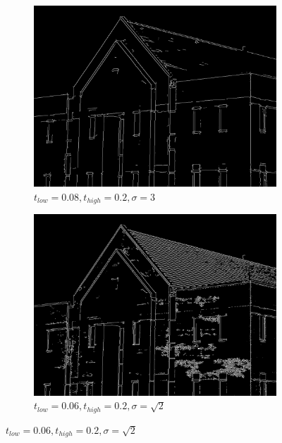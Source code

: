 \documentclass[a4paper]{article}
\begin{document}
\begin{figure}[h]
    
        \centering
        \begin{subfigure}[b]{0.3\textwidth}
                \centering
                \includegraphics[width=\textwidth]{q2-house-canny-020083.png}
                \caption{$t_{low}=0.08, t_{high}=0.2, \sigma=3$}
                \label{fig:4a}
        \end{subfigure}
        \begin{subfigure}[b]{0.3\textwidth}
                \centering
                \includegraphics[width=\textwidth]{q2-house-canny-02006rt2.png}
                \caption{$t_{low}=0.06, t_{high}=0.2, \sigma=\sqrt{2}$}
                \label{fig:4b}
                

\end{subfigure}
\end{figure}
\end{document}
